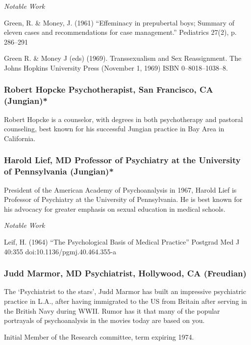 \begin{refsection}
\emph{Notable Work}

Green, R. \& Money, J. (1961) “Effeminacy in prepubertal boys; Summary of eleven cases and recommendations for case management.” Pediatrics 27(2), p. 286--291

Green R. \& Money J (eds) (1969). Transsexualism and Sex Reassignment. The Johns Hopkins University Press (November 1, 1969) ISBN 0--8018--1038--8.

\subsubsection{Robert Hopcke Psychotherapist, San Francisco, CA (Jungian)*}
\label{roberthopckepsychotherapistsanfranciscocajungian}

Robert Hopcke is a counselor, with degrees in both psychotherapy and pastoral counseling, best known for his successful Jungian practice in Bay Area in California.

\subsubsection{Harold Lief, MD Professor of Psychiatry at the University of Pennsylvania (Jungian)*}
\label{haroldliefmdprofessorofpsychiatryattheuniversityofpennsylvaniajungian}

President of the American Academy of Psychoanalysis in 1967, Harold Lief is Professor of Psychiatry at the University of Pennsylvania. He is best known for his advocacy for greater emphasis on sexual education in medical schools.

\emph{Notable Work}

Leif, H. (1964) “The Psychological Basis of Medical Practice” Postgrad Med J 40:355 doi:10.1136\slash pgmj.40.464.355-a

\subsubsection{Judd Marmor, MD Psychiatrist, Hollywood, CA (Freudian)}
\label{juddmarmormdpsychiatristhollywoodcafreudian}

The `Psychiatrist to the stars', Judd Marmor has built an impressive psychiatric practice in L.A., after having immigrated to the US from Britain after serving in the British Navy during WWII. Rumor has it that many of the popular portrayals of psychoanalysis in the movies today are based on you.

Initial Member of the Research committee, term expiring 1974.


\end{refsection}
